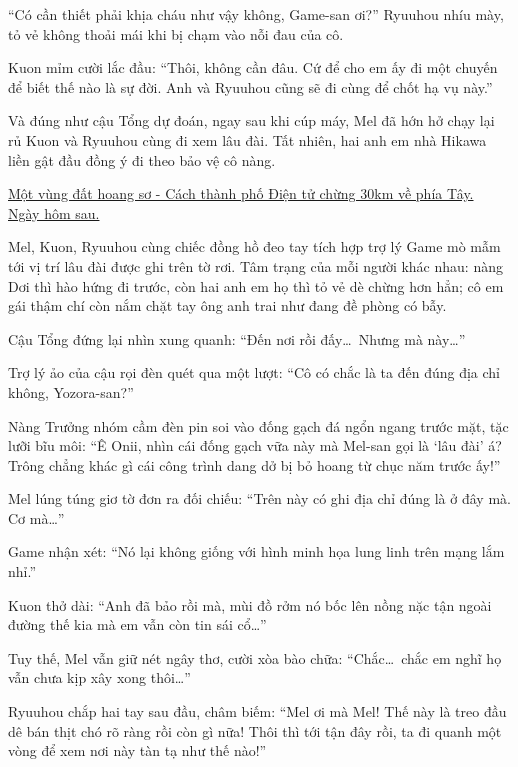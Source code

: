 \documentclass[../main.tex]{subfiles}
\begin{document}
``Có cần thiết phải khịa cháu như vậy không, Game-san ơi?'' Ryuuhou nhíu mày, tỏ vẻ không thoải mái khi bị chạm vào nỗi đau của cô.

Kuon mỉm cười lắc đầu: ``Thôi, không cần đâu. Cứ để cho em ấy đi một chuyến để biết thế nào là sự đời. Anh và Ryuuhou cũng sẽ đi cùng để chốt hạ vụ này.''

Và đúng như cậu Tổng dự đoán, ngay sau khi cúp máy, Mel đã hớn hở chạy lại rủ Kuon và Ryuuhou cùng đi xem lâu đài. Tất nhiên, hai anh em nhà Hikawa liền gật đầu đồng ý đi theo bảo vệ cô nàng.

\ct

\begin{center}
  \uline{Một vùng đất hoang sơ - Cách thành phố Điện tử chừng 30km về phía Tây.\\
    Ngày hôm sau.}
\end{center}

Mel, Kuon, Ryuuhou cùng chiếc đồng hồ đeo tay tích hợp trợ lý Game mò mẫm tới vị trí lâu đài được ghi trên tờ rơi. Tâm trạng của mỗi người khác nhau: nàng Dơi thì hào hứng đi trước, còn hai anh em họ thì tỏ vẻ dè chừng hơn hẳn; cô em gái thậm chí còn nắm chặt tay ông anh trai như đang đề phòng có bẫy.

Cậu Tổng đứng lại nhìn xung quanh: ``Đến nơi rồi đấy\dots\ Nhưng mà này\dots''

Trợ lý ảo của cậu rọi đèn quét qua một lượt: ``Cô có chắc là ta đến đúng địa chỉ không, Yozora-san?''

Nàng Trưởng nhóm cầm đèn pin soi vào đống gạch đá ngổn ngang trước mặt, tặc lưỡi bĩu môi: ``Ê Onii, nhìn cái đống gạch vữa này mà Mel-san gọi là `lâu đài' á? Trông chẳng khác gì cái công trình dang dở bị bỏ hoang từ chục năm trước ấy!''


Mel lúng túng giơ tờ đơn ra đối chiếu: ``Trên này có ghi địa chỉ đúng là ở đây mà. Cơ mà\dots''

Game nhận xét: ``Nó lại không giống với hình minh họa lung linh trên mạng lắm nhỉ.''

Kuon thở dài: ``Anh đã bảo rồi mà, mùi đồ rởm nó bốc lên nồng nặc tận ngoài đường thế kia mà em vẫn còn tin sái cổ\dots''

Tuy thế, Mel vẫn giữ nét ngây thơ, cười xòa bào chữa: ``Chắc\dots\ chắc em nghĩ họ vẫn chưa kịp xây xong thôi\dots''

Ryuuhou chắp hai tay sau đầu, châm biếm: ``Mel ơi mà Mel! Thế này là treo đầu dê bán thịt chó rõ ràng rồi còn gì nữa! Thôi thì tới tận đây rồi, ta đi quanh một vòng để xem nơi này tàn tạ như thế nào!''
\end{document}
